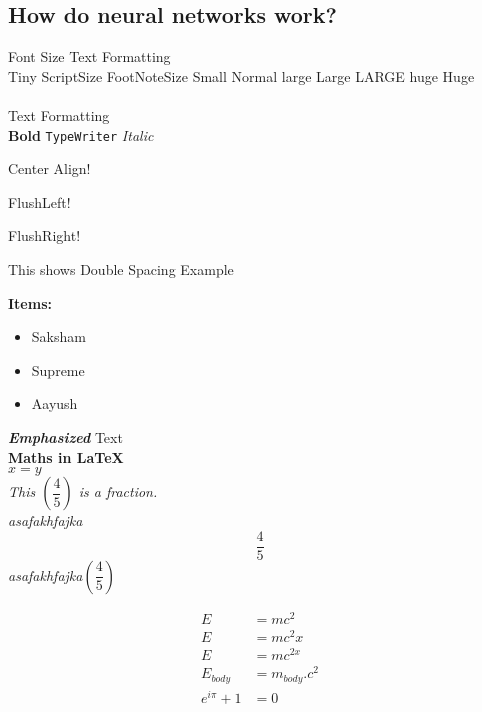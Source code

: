 \documentclass[titlepage, 12pt]{article}
\renewcommand{\frac}[2]{\left(\dfrac{#1}{#2}\right)}
\begin{document}
			\subsection{How do neural networks work?}
			Font Size Text Formatting\\
			{\tiny Tiny}
			{\scriptsize ScriptSize}
			{\footnotesize FootNoteSize}
			{\small Small}
			{\normalsize Normal}
			{\large large}
			{\Large Large}
			{\LARGE LARGE}
			{\huge huge}
			{\Huge Huge}
			\\
			\\
			Text Formatting\\
			\textbf{Bold}
			\texttt{TypeWriter}
			\textit{Italic}
	\begin{center}
		{\Huge Center Align!}
	\end{center}
	\begin{flushleft}
		{\Huge FlushLeft!}
	\end{flushleft}
	\begin{flushright}
		{\Huge FlushRight!}
	\end{flushright}
	\begin{doublespace}{This shows Double Spacing Example\\}
	\end{doublespace}
	{\Large\textbf{Items:}}
	\begin{itemize}
		\item Saksham
		\item Supreme
		\item Aayush \\
	\end{itemize}
	\emph{\Large\textbf{Emphasized}}
	{\Large{Text}}
	\\
	{\Huge\textbf{Maths in LaTeX}}
	\\
	\emph{$x = y$ \\
		This $\frac{4}{5}$ is a fraction. \\
		asafakhfajka\[\dfrac{4}{5}\]
		asafakhfajka\(\frac{4}{5}\)}
	
	
	\begin{align}
		E &= mc^2 \\
		E &= mc^2 x \\
		E &= mc^{2x} \\
		E_{body} &= m_{body}.c^2 \\
		e^{i\pi} + 1 &= 0 
	\end{align}
	
	
\end{document}
